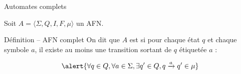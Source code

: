 
\begingroup

\begin{frame}{Automates complets}

  Soit $A = \langle \Sigma, Q, I, F, \mu \rangle$ un AFN.

  \begin{block}{Définition -- AFN complet}
    On dit que $A$ est  si pour chaque état $q$ et chaque symbole $a$, il existe au moins une transition sortant de $q$ étiquetée $a$ :

    $$\alert{\forall q\in Q,  \forall a\in \Sigma, \exists q' \in Q, q \xrightarrow{a} q' \in \mu}$$
  \end{block}
  
\end{frame}

\endgroup
